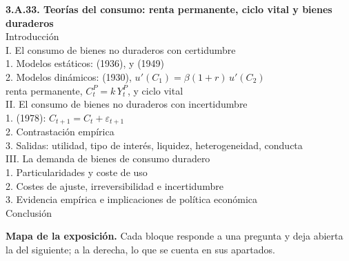 \documentclass[11pt]{article}
\begin{document}
\begin{esquema}
\textbf{3.A.33. Teorías del consumo: renta permanente, ciclo vital y bienes duraderos}\\[2pt]
Introducción\\
I. El consumo de bienes no duraderos con certidumbre\\
\hspace*{1.5em}1. Modelos estáticos:  (1936),  y  (1949)\\
\hspace*{1.5em}2. Modelos dinámicos:  (1930), $u'(C_1)=\beta(1+r)\,u'(C_2)$\\
\hspace*{3em}renta permanente, $C^P_t=k\,Y^P_t$, y ciclo vital\\
II. El consumo de bienes no duraderos con incertidumbre\\
\hspace*{1.5em}1.  (1978): $C_{t+1}=C_t+\varepsilon_{t+1}$\\
\hspace*{1.5em}2. Contrastación empírica\\
\hspace*{1.5em}3. Salidas: utilidad, tipo de interés, liquidez, heterogeneidad, conducta\\
III. La demanda de bienes de consumo duradero\\
\hspace*{1.5em}1. Particularidades y coste de uso\\
\hspace*{1.5em}2. Costes de ajuste, irreversibilidad e incertidumbre\\
\hspace*{1.5em}3. Evidencia empírica e implicaciones de política económica\\
Conclusión
\end{esquema}

\begin{anotaciones}
\textbf{Mapa de la exposición.} Cada bloque responde a una pregunta y deja abierta la del siguiente; a la derecha, lo que se cuenta en sus apartados.
\begin{infografiacaja}
\caption{Mapa de la exposición: la pregunta de cada bloque y el hilo que los une}\label{figu:mapa-tema}
\end{infografiacaja}
\end{anotaciones}
\end{document}
